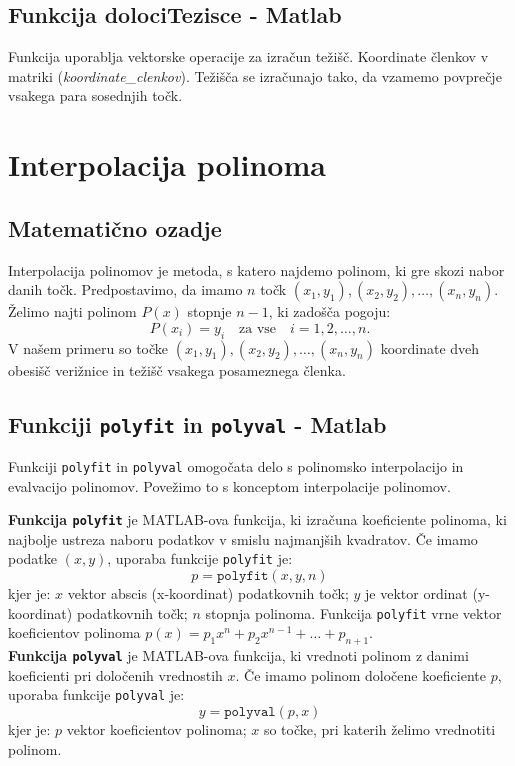 \documentclass{article}
\begin{document}
    \subsection*{Funkcija dolociTezisce - Matlab}
        Funkcija uporablja vektorske operacije za izračun težišč. Koordinate členkov v matriki (\textit{koordinate\_clenkov}). Težišča se izračunajo tako, da vzamemo povprečje vsakega para sosednjih točk.
        \medskip

\section{Interpolacija polinoma}
    \subsection{Matematično ozadje}
        Interpolacija polinomov je metoda, s katero najdemo polinom, ki gre skozi nabor danih točk. Predpostavimo, da imamo \( n \) točk \((x_1, y_1), (x_2, y_2), \ldots, (x_n, y_n)\). Želimo najti polinom \( P(x) \) stopnje \( n-1 \), ki zadošča pogoju:
        \[
        P(x_i) = y_i \quad \text{za vse} \quad i = 1, 2, \ldots, n.
        \]
        V našem primeru so točke \((x_1, y_1), (x_2, y_2), \ldots, (x_n, y_n)\) koordinate dveh obesišč verižnice in težišč vsakega posameznega členka.

        \subsection*{Funkciji \texttt{polyfit} in \texttt{polyval} - Matlab} 
        Funkciji \texttt{polyfit} in \texttt{polyval} omogočata delo s polinomsko interpolacijo in evalvacijo polinomov. Povežimo to s konceptom interpolacije polinomov.
        
        \textbf{Funkcija \texttt{polyfit}} je MATLAB-ova funkcija, ki izračuna koeficiente polinoma, ki najbolje ustreza naboru podatkov v smislu najmanjših kvadratov. Če imamo podatke \((x, y)\), uporaba funkcije \texttt{polyfit} je:
        \[
        p = \texttt{polyfit}(x, y, n)
        \]
        kjer je: \( x \) vektor abscis (x-koordinat) podatkovnih točk; \( y \) je vektor ordinat (y-koordinat) podatkovnih točk; \( n \) stopnja polinoma.
        Funkcija \texttt{polyfit} vrne vektor koeficientov polinoma  
        \( p(x) = p_1 x^n + p_2 x^{n-1} + \ldots + p_{n+1} \). 
        \\
        
        \vspace{0.1cm}
        \textbf{Funkcija \texttt{polyval}} je MATLAB-ova funkcija, ki vrednoti polinom z danimi koeficienti pri določenih vrednostih \( x \). Če imamo polinom določene koeficiente \( p \), uporaba funkcije \texttt{polyval} je:
        \[
        y = \texttt{polyval}(p, x)
        \]
        kjer je: \( p \) vektor koeficientov polinoma;  \( x \) so točke, pri katerih želimo vrednotiti polinom.
\end{document}
